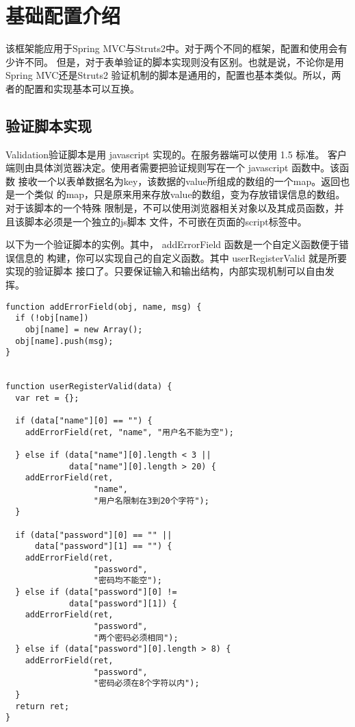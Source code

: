 \section{基础配置介绍}
该框架能应用于Spring MVC与Struts2中。对于两个不同的框架，配置和使用会有少许不同。
但是，对于表单验证的脚本实现则没有区别。也就是说，不论你是用Spring MVC还是Struts2
验证机制的脚本是通用的，配置也基本类似。所以，两者的配置和实现基本可以互换。

\subsection{验证脚本实现}
Validation验证脚本是用 javascript 实现的。在服务器端可以使用 1.5 标准。
客户端则由具体浏览器决定。使用者需要把验证规则写在一个 javascript 函数中。该函数
接收一个以表单数据名为key，该数据的value所组成的数组的一个map。返回也是一个类似
的map，只是原来用来存放value的数组，变为存放错误信息的数组。对于该脚本的一个特殊
限制是，不可以使用浏览器相关对象以及其成员函数，并且该脚本必须是一个独立的js脚本
文件，不可嵌在页面的script标签中。

以下为一个验证脚本的实例。其中， addErrorField 函数是一个自定义函数便于错误信息的
构建，你可以实现自己的自定义函数。其中 userRegisterValid 就是所要实现的验证脚本
接口了。只要保证输入和输出结构，内部实现机制可以自由发挥。

\begin{verbatim}
function addErrorField(obj, name, msg) {
  if (!obj[name])
    obj[name] = new Array();
  obj[name].push(msg);
}


function userRegisterValid(data) {
  var ret = {};

  if (data["name"][0] == "") {
    addErrorField(ret, "name", "用户名不能为空");

  } else if (data["name"][0].length < 3 || 
             data["name"][0].length > 20) {
    addErrorField(ret,
                  "name",
                  "用户名限制在3到20个字符");
  }

  if (data["password"][0] == "" ||
      data["password"][1] == "") {
    addErrorField(ret,
                  "password",
                  "密码均不能空");
  } else if (data["password"][0] != 
             data["password"][1]) {
    addErrorField(ret,
                  "password",
                  "两个密码必须相同");
  } else if (data["password"][0].length > 8) {
    addErrorField(ret,
                  "password",
                  "密码必须在8个字符以内");
  }
  return ret;
}
\end{verbatim}


